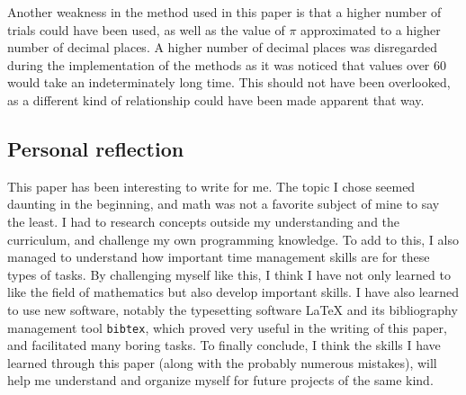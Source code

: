 Another weakness in the method used in this paper is that a higher number of trials could have been used, as well as the value of $\pi$ approximated to a higher number of decimal places. A higher number of decimal places was disregarded during the implementation of the methods as it was noticed that values over 60 would take an indeterminately long time. This should not have been overlooked, as a different kind of relationship could have been made apparent that way. 


\subsection{Personal reflection}

This paper has been interesting to write for me. The topic I chose seemed daunting in the beginning, and math was not a favorite subject of mine to say the least. I had to research concepts outside my understanding and the curriculum, and challenge my own programming knowledge. To add to this, I also managed to understand how important time management skills are for these types of tasks. By challenging myself like this, I think I have not only learned to like the field of mathematics but also develop important skills. I have also learned to use new software, notably the typesetting software \LaTeX{} and its bibliography management tool \verb|bibtex|, which proved very useful in the writing of this paper, and facilitated many boring tasks. To finally conclude, I think the skills I have learned through this paper (along with the probably numerous mistakes), will help me understand and organize myself for future projects of the same kind. 